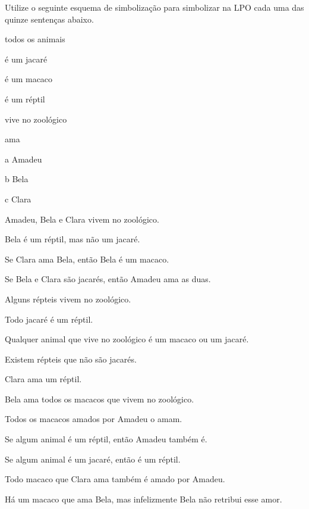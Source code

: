 \practiceproblems
\solutions
\problempart
Utilize o seguinte esquema de simbolização para simbolizar na LPO cada uma das quinze sentenças abaixo.
\begin{center}
\begin{ekey}
\item[\text{domínio}] todos os animais
\item[\atom{J}{x}]  é um jacaré
\item[\atom{M}{x}]  é um macaco
\item[\atom{R}{x}]  é um réptil
\item[\atom{Z}{x}]  vive no zoológico
\item[\atom{A}{x,y}]  ama 
\item[a] Amadeu
\item[b] Bela
\item[c] Clara
\end{ekey}
\end{center}
\begin{earg}
\item Amadeu, Bela e Clara vivem no zoológico.
\item Bela é um réptil, mas não um jacaré.
\item Se Clara ama Bela, então Bela é um macaco.
\item Se Bela e Clara são jacarés, então Amadeu ama as duas.
\item Alguns répteis vivem no zoológico.
\item Todo jacaré é um réptil.
\item Qualquer animal que vive no zoológico é um macaco ou um jacaré.
\item Existem répteis que não são jacarés.
\item Clara ama um réptil.
\item Bela ama todos os macacos que vivem no zoológico.
\item Todos os macacos amados por Amadeu o amam.
\item Se algum animal é um réptil, então Amadeu também é.
\item Se algum animal é um jacaré, então é um réptil.
\item Todo macaco que Clara ama também é amado por Amadeu.
\item Há um macaco que ama Bela, mas infelizmente Bela não retribui esse amor.
\end{earg}

